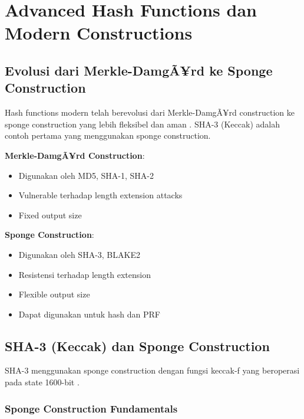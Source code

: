 ﻿\section{Advanced Hash Functions dan Modern Constructions}

\subsection{Evolusi dari Merkle-DamgÃ¥rd ke Sponge Construction}

Hash functions modern telah berevolusi dari Merkle-DamgÃ¥rd construction ke sponge construction yang lebih fleksibel dan aman \cite{bertoni2011}. SHA-3 (Keccak) adalah contoh pertama yang menggunakan sponge construction.

\textbf{Merkle-DamgÃ¥rd Construction}:
\begin{itemize}
  \item Digunakan oleh MD5, SHA-1, SHA-2
  \item Vulnerable terhadap length extension attacks
  \item Fixed output size
\end{itemize}

\textbf{Sponge Construction}:
\begin{itemize}
  \item Digunakan oleh SHA-3, BLAKE2
  \item Resistensi terhadap length extension
  \item Flexible output size
  \item Dapat digunakan untuk hash dan PRF
\end{itemize}

\subsection{SHA-3 (Keccak) dan Sponge Construction}

SHA-3 menggunakan sponge construction dengan fungsi keccak-f yang beroperasi pada state 1600-bit \cite{keccak2015}.

\subsubsection{Sponge Construction Fundamentals}

